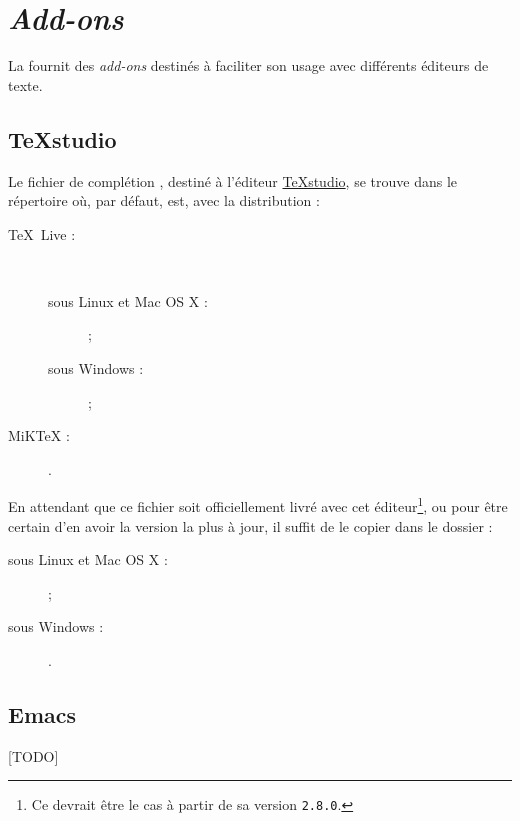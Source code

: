 \chapter{\emph{Add-ons}}\label{cha-add-ons}

La \yatcl{} fournit des \emph{add-ons} destinés à faciliter son usage avec
différents éditeurs de texte.

\section{TeXstudio}
\label{sec-texstudio}

Le fichier de complétion , destiné à l'éditeur
\href{http://texstudio.sourceforge.net/}{TeXstudio}, se trouve dans le
répertoire  où,
par défaut,  est, avec la distribution :
\begin{description}
\item[\TeX{}~Live :]\
  \begin{description}
  \item[sous Linux et Mac OS X :] \unixtldirectory\tldistdirectory\versiontl ;
  \item[sous Windows :] \wintldirectory\tldistdirectory\versiontl ;
  \end{description}
\item[MiK\TeX{} :] \miktexdistdirectory.
\end{description}
En attendant que ce fichier soit officiellement livré avec cet
éditeur\footnote{Ce devrait être le cas à partir de sa version
  \texttt{2.8.0}.}, ou pour être certain d'en avoir la version la plus à jour,
il suffit de le copier dans le dossier :
\begin{description}
\item[sous Linux et Mac OS X :]  ;
\item[sous Windows :] .
\end{description}

\section{Emacs}
\label{sec-emacs}

[TODO]
%
\iffalse
\fi

